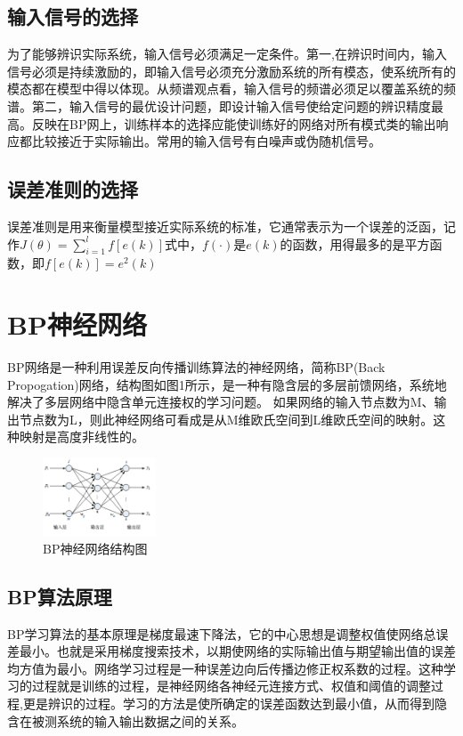 \documentclass[UTF8]{ctexart}
\begin{document}
\subsection{输入信号的选择}
为了能够辨识实际系统，输入信号必须满足一定条件。第一,在辨识时间内，输入信号必须是持续激励的，即输入信号必须充分激励系统的所有模态，使系统所有的模态都在模型中得以体现。从频谱观点看，输入信号的频谱必须足以覆盖系统的频谱。第二，输入信号的最优设计问题，即设计输入信号使给定问题的辨识精度最高。反映在BP网上，训练样本的选择应能使训练好的网络对所有模式类的输出响应都比较接近于实际输出。常用的输入信号有白噪声或伪随机信号。
\subsection{误差准则的选择}
误差准则是用来衡量模型接近实际系统的标准，它通常表示为一个误差的泛函，记作$ J(\theta)=\sum^l_{i=1}f[e(k)] $式中，$ f(\cdot) $是$ e(k) $的函数，用得最多的是平方函数，即$ f[e(k)]=e^2(k) $
\section{BP神经网络}
BP网络是一种利用误差反向传播训练算法的神经网络，简称BP(Back Propogation)网络，结构图如图1所示，是一种有隐含层的多层前馈网络，系统地解决了多层网络中隐含单元连接权的学习问题。 如果网络的输入节点数为M、输出节点数为L，则此神经网络可看成是从M维欧氏空间到L维欧氏空间的映射。这种映射是高度非线性的。
\begin{figure}[htbp]
	\centering
	\includegraphics [width=0.3\textwidth]{fig/png1.png}
	\caption{BP神经网络结构图}
	\label{fig:my_png_1}
\end{figure}
\subsection{BP算法原理}
 BP学习算法的基本原理是梯度最速下降法，它的中心思想是调整权值使网络总误差最小。也就是采用梯度搜索技术，以期使网络的实际输出值与期望输出值的误差均方值为最小。网络学习过程是一种误差边向后传播边修正权系数的过程。这种学习的过程就是训练的过程，是神经网络各神经元连接方式、权值和阈值的调整过程,更是辨识的过程。学习的方法是使所确定的误差函数达到最小值，从而得到隐含在被测系统的输入输出数据之间的关系。
\end{document}
